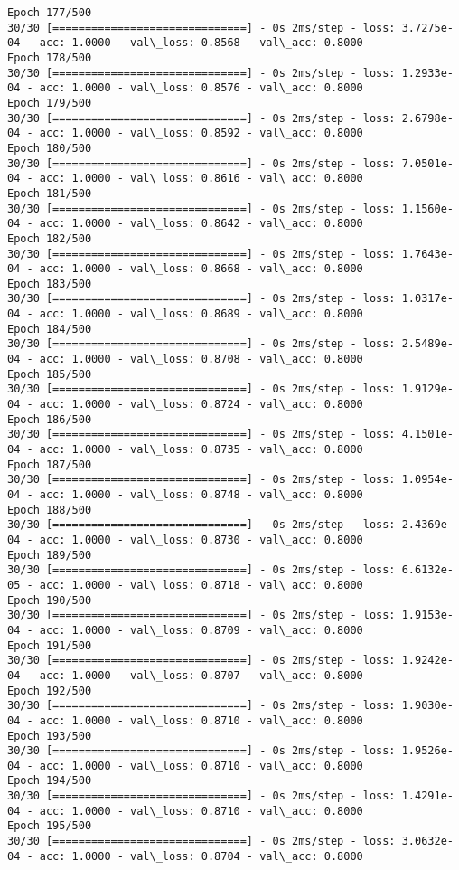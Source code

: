 \documentclass[11pt]{article}
\begin{document}
\begin{Verbatim}[commandchars=\\\{\}]
Epoch 177/500
30/30 [==============================] - 0s 2ms/step - loss: 3.7275e-04 - acc: 1.0000 - val\_loss: 0.8568 - val\_acc: 0.8000
Epoch 178/500
30/30 [==============================] - 0s 2ms/step - loss: 1.2933e-04 - acc: 1.0000 - val\_loss: 0.8576 - val\_acc: 0.8000
Epoch 179/500
30/30 [==============================] - 0s 2ms/step - loss: 2.6798e-04 - acc: 1.0000 - val\_loss: 0.8592 - val\_acc: 0.8000
Epoch 180/500
30/30 [==============================] - 0s 2ms/step - loss: 7.0501e-04 - acc: 1.0000 - val\_loss: 0.8616 - val\_acc: 0.8000
Epoch 181/500
30/30 [==============================] - 0s 2ms/step - loss: 1.1560e-04 - acc: 1.0000 - val\_loss: 0.8642 - val\_acc: 0.8000
Epoch 182/500
30/30 [==============================] - 0s 2ms/step - loss: 1.7643e-04 - acc: 1.0000 - val\_loss: 0.8668 - val\_acc: 0.8000
Epoch 183/500
30/30 [==============================] - 0s 2ms/step - loss: 1.0317e-04 - acc: 1.0000 - val\_loss: 0.8689 - val\_acc: 0.8000
Epoch 184/500
30/30 [==============================] - 0s 2ms/step - loss: 2.5489e-04 - acc: 1.0000 - val\_loss: 0.8708 - val\_acc: 0.8000
Epoch 185/500
30/30 [==============================] - 0s 2ms/step - loss: 1.9129e-04 - acc: 1.0000 - val\_loss: 0.8724 - val\_acc: 0.8000
Epoch 186/500
30/30 [==============================] - 0s 2ms/step - loss: 4.1501e-04 - acc: 1.0000 - val\_loss: 0.8735 - val\_acc: 0.8000
Epoch 187/500
30/30 [==============================] - 0s 2ms/step - loss: 1.0954e-04 - acc: 1.0000 - val\_loss: 0.8748 - val\_acc: 0.8000
Epoch 188/500
30/30 [==============================] - 0s 2ms/step - loss: 2.4369e-04 - acc: 1.0000 - val\_loss: 0.8730 - val\_acc: 0.8000
Epoch 189/500
30/30 [==============================] - 0s 2ms/step - loss: 6.6132e-05 - acc: 1.0000 - val\_loss: 0.8718 - val\_acc: 0.8000
Epoch 190/500
30/30 [==============================] - 0s 2ms/step - loss: 1.9153e-04 - acc: 1.0000 - val\_loss: 0.8709 - val\_acc: 0.8000
Epoch 191/500
30/30 [==============================] - 0s 2ms/step - loss: 1.9242e-04 - acc: 1.0000 - val\_loss: 0.8707 - val\_acc: 0.8000
Epoch 192/500
30/30 [==============================] - 0s 2ms/step - loss: 1.9030e-04 - acc: 1.0000 - val\_loss: 0.8710 - val\_acc: 0.8000
Epoch 193/500
30/30 [==============================] - 0s 2ms/step - loss: 1.9526e-04 - acc: 1.0000 - val\_loss: 0.8710 - val\_acc: 0.8000
Epoch 194/500
30/30 [==============================] - 0s 2ms/step - loss: 1.4291e-04 - acc: 1.0000 - val\_loss: 0.8710 - val\_acc: 0.8000
Epoch 195/500
30/30 [==============================] - 0s 2ms/step - loss: 3.0632e-04 - acc: 1.0000 - val\_loss: 0.8704 - val\_acc: 0.8000

\end{Verbatim}
\end{document}
